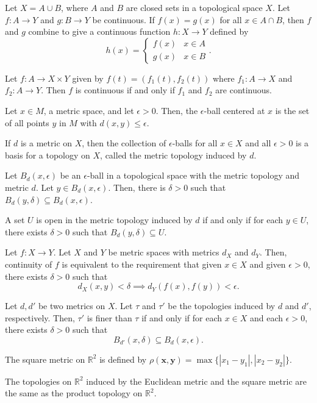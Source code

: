 \documentclass{article}
\newcommand{\R}{\mathbb R}
\begin{document}
    Let $X = A \cup B$, where $A$ and $B$ are closed sets in a topological space $X$.
    Let $f: A \to Y$ and $g: B \to Y$ be continuous.
    If $f(x) = g(x)$ for all $x \in A \cap B$, then $f$ and $g$ combine to give a continuous function $h: X \to Y$ defined by
    $$h(x) = \begin{cases} f(x) & x \in A \\ g(x) & x \in B \end{cases}.$$

\medskip{}

    Let $f: A \to X \times Y$ given by $f(t) = (f_1(t), f_2(t))$ where $f_1: A \to X$ and $f_2: A \to Y$. Then $f$ is continuous if and only if $f_1$ and $f_2$ are continuous.

\medskip{}

    Let $x \in M$, a metric space, and let $\epsilon > 0$. Then, the $\epsilon$-ball centered at $x$ is the set of all points $y$ in $M$ with $d(x,y) \leq \epsilon$.

\medskip{}

    If $d$ is a metric on $X$, then the collection of $\epsilon$-balls for all $x \in X$ and all $\epsilon > 0$ is a basis for a topology on $X$, called the metric topology induced by $d$.

\medskip{}

    Let $B_d(x, \epsilon)$ be an $\epsilon$-ball in a topological space with the metric topology and metric $d$. Let $y \in B_d(x, \epsilon)$. Then, there is $\delta > 0$ such that $B_d(y, \delta) \subseteq B_d(x,\epsilon)$.

\medskip{}

    A set $U$ is open in the metric topology induced by $d$ if and only if for each $y \in U$, there exists $\delta > 0$ such that $B_d(y, \delta) \subseteq U$.

\medskip{}

	Let $f: X \to Y$. Let $X$ and $Y$ be metric spaces with metrics $d_X$ and $d_Y$.
	Then, continuity of $f$ is equivalent to the requirement that given $x \in X$ and given $\epsilon > 0$, there exists $\delta > 0$ such that $$d_X(x,y) < \delta \implies d_Y(f(x),f(y))< \epsilon.$$

\medskip{}

	Let $d, d'$ be two metrics on $X$. Let $\tau$ and $\tau'$ be the topologies induced by $d$ and $d'$, respectively. Then, $\tau'$ is finer than $\tau$ if and only if for each $x \in X$ and each $\epsilon > 0$, there exists $\delta > 0$ such that $$B_{d'}(x,\delta) \subseteq B_d(x,\epsilon).$$

\medskip{}

	The square metric on $\R^2$ is defined by $\rho(\mathbf x,\mathbf y) = \max\{|x_1-y_1|, |x_2-y_2|\}$.

\medskip{}

	The topologies on $\R^2$ induced by the Euclidean metric and the square metric are the same as the product topology on $\R^2$.
\end{document}
